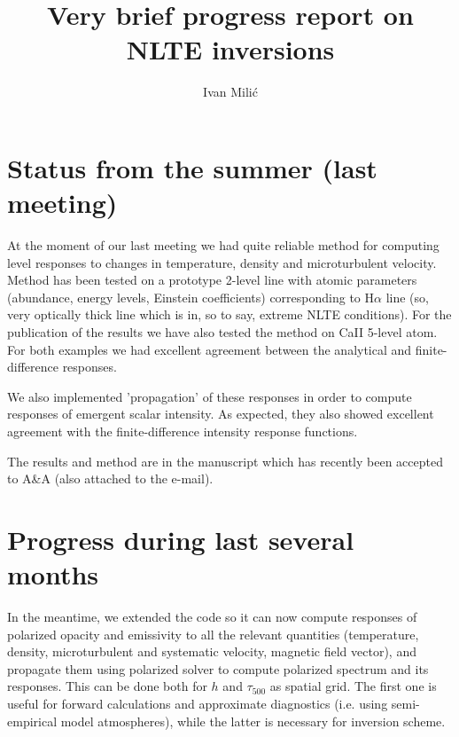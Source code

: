 \documentclass[a4paper,10pt]{article}
\title{Very brief progress report on NLTE inversions}
\author{Ivan Mili\'{c}}
\begin{document}
\maketitle

\section{Status from the summer (last meeting)}
At the moment of our last meeting we had quite reliable method for computing level responses to changes in temperature, density and microturbulent velocity. Method has been tested on a prototype 2-level line with atomic parameters (abundance, energy levels, Einstein coefficients) corresponding to H$\alpha$ line (so, very optically thick line which is in, so to say, extreme NLTE conditions). For the publication of the results we have also tested the method on CaII 5-level atom. For both examples we had excellent agreement between the analytical and finite-difference responses. 

We also implemented 'propagation' of these responses in order to compute responses of emergent scalar intensity. As expected, they also showed excellent agreement with the finite-difference intensity response functions. 

The results and method are in the manuscript which has recently been accepted to A\&A (also attached to the e-mail). 

\section{Progress during last several months}

In the meantime, we extended the code so it can now compute responses of polarized opacity and emissivity to all the relevant quantities (temperature, density, microturbulent and systematic velocity, magnetic field vector), and propagate them using polarized solver to compute polarized spectrum and its responses. This can be done both for $h$ and $\tau_{500}$ as spatial grid. The first one is useful for forward calculations and approximate diagnostics (i.e. using semi-empirical model atmospheres), while the latter is necessary for inversion scheme.
\end{document}
